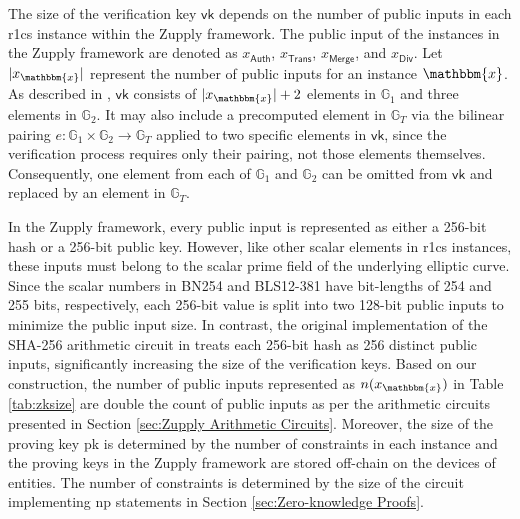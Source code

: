 The size of the verification key \(\textsf{vk}\) depends on the number of public inputs in each \gls{r1cs} instance within the Zupply framework. The public input of the instances in the Zupply framework are denoted as \(x_\mathsf{Auth}\), \(x_\mathsf{Trans}\), \(x_\mathsf{Merge}\), and \(x_\mathsf{Div}\).
Let \(|x_\mathbbm{x}|\) represent the number of public inputs for an instance \(\mathbbm{x}\). As described in \cite{Groth2016}, \(\textsf{vk}\) consists of \(|x_\mathbbm{x}| + 2\) elements in \(\mathbb{G}_1\) and three elements in \(\mathbb{G}_2\). It may also include a precomputed element in \(\mathbb{G}_T\) via the bilinear pairing \( e: \mathbb{G}_1 \times \mathbb{G}_2 \to \mathbb{G}_T \) applied to two specific elements in \(\textsf{vk}\), since the verification process requires only their pairing, not those elements themselves. Consequently, one element from each of \(\mathbb{G}_1\) and \(\mathbb{G}_2\) can be omitted from \(\textsf{vk}\) and replaced by an element in \(\mathbb{G}_T\).

In the Zupply framework, every public input is represented as either a 256-bit hash or a 256-bit public key. However, like other scalar elements in \gls{r1cs} instances, these inputs must belong to the scalar prime field of the underlying elliptic curve. Since the scalar numbers in BN254 and BLS12-381 have bit-lengths of 254 and 255 bits, respectively, each 256-bit value is split into two 128-bit public inputs to minimize the public input size. In contrast, the original implementation of the SHA-256 arithmetic circuit in \cite{libsnark} treats each 256-bit hash as 256 distinct public inputs, significantly increasing the size of the verification keys. Based on our construction, the number of public inputs represented as $n(x_\mathbbm{x})$ in Table \ref{tab:zksize} are double the count of public inputs as per the arithmetic circuits presented in Section \ref{sec:Zupply Arithmetic Circuits}. Moreover, the size of the proving key \textsf{pk} is determined by the number of constraints in each instance and the proving keys in the Zupply framework are stored off-chain on the devices of entities. The number of constraints is determined by the size of the circuit implementing \gls{np} statements in Section \ref{sec:Zero-knowledge Proofs}. 

